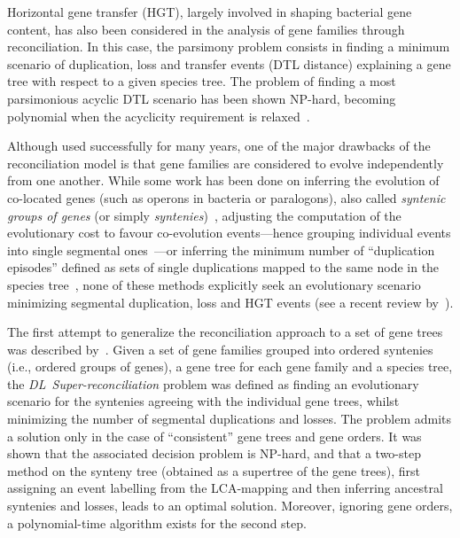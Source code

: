 Horizontal gene transfer (HGT), largely involved in shaping bacterial gene content, has also been considered in the analysis of gene families through reconciliation.
In this case, the parsimony problem consists in finding a minimum scenario of duplication, loss and transfer events (DTL distance) explaining a gene tree with respect to a given species tree.
The problem of finding a most parsimonious acyclic DTL scenario has been shown NP-hard, becoming polynomial when the acyclicity requirement is relaxed~\parencite{Bansal2012EfficientAlgorithmsReconciliation,Tofigh2011SimultaneousIdentificationDuplications}.

Although used successfully for many years, one of the major drawbacks of the reconciliation model is that gene families are considered to evolve independently from one another.
While some work has been done on inferring the evolution of co-located genes (such as operons in bacteria or paralogons), also called \emph{syntenic groups of genes} (or simply \emph{syntenies})~\parencite{Berard2012EvolutionGeneNeighborhoods,Duchemin2017DecostarReconstructingAncestral}, adjusting the computation of the evolutionary cost to favour co-evolution events---hence grouping individual events into single segmental ones~\parencite{Duchemin2017PhylogenyDependenciesDependencies}---or inferring the minimum number of \enquote{duplication episodes} defined as sets of single duplications mapped to the same node in the species tree~\parencite{Dondi2019ReconcilingMultipleGenes,Paszek2018EfficientAlgorithmsGenomic}, none of these methods explicitly seek an evolutionary scenario minimizing segmental duplication, loss and HGT events (see a recent review by~\textcite{ElMabrouk2021PredictingEvolutionSynteniesan}).

The first attempt to generalize the reconciliation approach to a set of gene trees was described by~\textcite{Delabre2020EvolutionSegmentalDuplications}.
Given a set of gene families grouped into ordered syntenies (i.e., ordered groups of genes), a gene tree for each gene family and a species tree, the \emph{DL~Super-reconciliation} problem was defined as finding an evolutionary scenario for the syntenies agreeing with the individual gene trees, whilst minimizing the number of segmental duplications and losses.
The problem admits a solution only in the case of \enquote{consistent} gene trees and gene orders.
It was shown that the associated decision problem is NP-hard, and that a two-step method on the synteny tree (obtained as a supertree of the gene trees), first assigning an event labelling from the LCA-mapping and then inferring ancestral syntenies and losses, leads to an optimal solution.
Moreover, ignoring gene orders, a polynomial-time algorithm exists for the second step.

